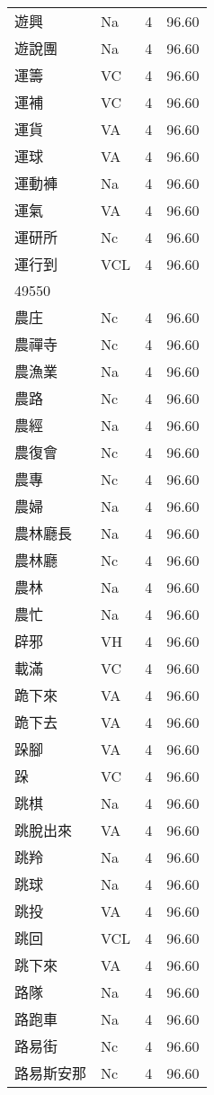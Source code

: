 \documentclass[twocolumn]{book}
\begin{document}
\begin{supertabular}{llrr}
遊興 & Na & 4 &  96.60\\
遊說團 & Na & 4 &  96.60\\
運籌 & VC & 4 &  96.60\\
運補 & VC & 4 &  96.60\\
運貨 & VA & 4 &  96.60\\
運球 & VA & 4 &  96.60\\
運動褲 & Na & 4 &  96.60\\
運氣 & VA & 4 &  96.60\\
運研所 & Nc & 4 &  96.60\\
運行到 & VCL & 4 &  96.60\\
49550\\
農庄 & Nc & 4 &  96.60\\
農禪寺 & Nc & 4 &  96.60\\
農漁業 & Na & 4 &  96.60\\
農路 & Nc & 4 &  96.60\\
農經 & Na & 4 &  96.60\\
農復會 & Nc & 4 &  96.60\\
農專 & Nc & 4 &  96.60\\
農婦 & Na & 4 &  96.60\\
農林廳長 & Na & 4 &  96.60\\
農林廳 & Nc & 4 &  96.60\\
農林 & Na & 4 &  96.60\\
農忙 & Na & 4 &  96.60\\
辟邪 & VH & 4 &  96.60\\
載滿 & VC & 4 &  96.60\\
跪下來 & VA & 4 &  96.60\\
跪下去 & VA & 4 &  96.60\\
跺腳 & VA & 4 &  96.60\\
跺 & VC & 4 &  96.60\\
跳棋 & Na & 4 &  96.60\\
跳脫出來 & VA & 4 &  96.60\\
跳羚 & Na & 4 &  96.60\\
跳球 & Na & 4 &  96.60\\
跳投 & VA & 4 &  96.60\\
跳回 & VCL & 4 &  96.60\\
跳下來 & VA & 4 &  96.60\\
路隊 & Na & 4 &  96.60\\
路跑車 & Na & 4 &  96.60\\
路易街 & Nc & 4 &  96.60\\
路易斯安那 & Nc & 4 &  96.60\\

\end{supertabular}
\end{document}
